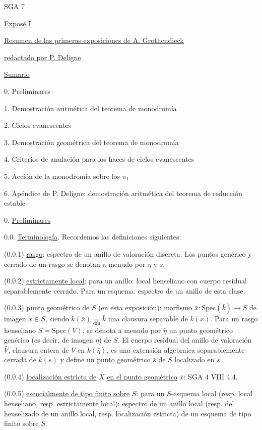 


SGA 7


\underline{Exposé I}


\underline{\underline{Resumen de las primeras exposiciones de A. Grothendieck}}


\underline{redactado por P. Deligne}


\underline{Sumario}

0. Preliminares

1. Demostración aritmética del teorema de monodromía

2. Ciclos evanescentes

3. Demostración geométrica del teorema de monodromía

4. Criterios de anulación para los haces de ciclos evanescentes

5. Acción de la monodromía sobre los $\pi_1$

6. Apéndice de P. Deligne: demostración aritmética del
teorema de reducción estable


0. \underline{Preliminares}

0.0. \underline{Terminología}. Recordemos las definiciones siguientes:

(0.0.1)    \underline{rasgo}: espectro de un anillo de valoración discreta. Los puntos genérico y cerrado de un rasgo se denotan a menudo por $\eta$ y $s$.

(0.0.2)    \underline{estrictamente local}: para un anillo: local henseliano con cuerpo residual separablemente cerrado. Para un esquema: espectro de un anillo de esta clase.

(0.0.3)    \underline{punto geométrico de} $S$ (en esta exposición): morfismo $\bar{x} : \mathrm{Spec}(\bar{k}) \longrightarrow S$ de imagen $x \in S$, siendo $k(\bar{x}) \underset{\mathrm{dfn}}{=} \bar{k}$ una clausura separable de $k(x)$. Para un rasgo henseliano $S = \mathrm{Spec}(V)$, se denota a menudo por $\bar{\eta}$ un punto geométrico genérico (es decir, de imagen $\eta$) de $S$. El cuerpo residual del anillo de valoración $\bar{V}$, clausura entera de $V$ en $k(\bar{\eta})$, es una extensión algebraica separablemente cerrada de $k(s)$ y define un punto geométrico $\bar{s}$ de $S$ localizado en $s$.



(0.0.4)    \underline{localización estricta de} $X$ \underline{en el punto geométrico} $\bar{x}$: SGA 4 VIII 4.4.

(0.0.5)    \underline{esencialmente de tipo finito sobre} $S$: para un $S$-esquema local (resp. local henseliano, resp. estrictamente local): espectro de un anillo local (resp. del henselizado de un anillo local, resp. localización estricta) de un esquema de tipo finito sobre $S$.


